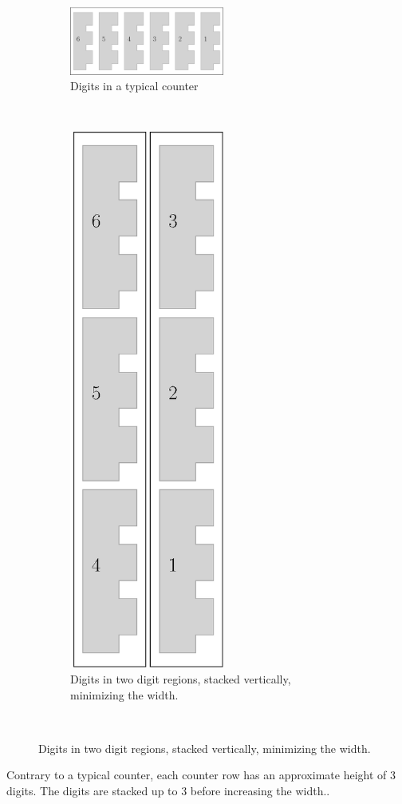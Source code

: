 \begin{figure}[H]
    \centering
    \begin{subfigure}[t]{0.48\textwidth}
        \centering
        \includegraphics[width=2in]{digits_normal_counter}
        \caption{\label{fig:digits_normal_counter} Digits in a typical counter}
    \end{subfigure}%
    ~
    \begin{subfigure}[t]{0.48\textwidth}
        \centering
        \includegraphics[width=2in]{digits_digit_region_counter}
        \caption{\label{fig:digits_digit_region_counter} Digits in two digit regions, stacked vertically, minimizing the width. }
    \end{subfigure}%
    ~
\end{figure}

Contrary to a typical counter, each counter row has an approximate height of 3 digits.
The digits are stacked up to 3 before increasing the width..